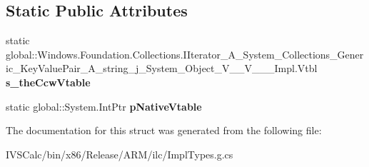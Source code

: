 \subsection*{Static Public Attributes}
\begin{DoxyCompactItemize}
\item 
\mbox{\label{struct_windows_1_1_foundation_1_1_collections_1_1_i_iterator___a___system___collections___generi1b6291336687b5a660c835303ec8be78_a1b742dc3e4c25b4e0a80811a9b7ffa29}} 
static global\+::\+Windows.\+Foundation.\+Collections.\+I\+Iterator\+\_\+\+A\+\_\+\+System\+\_\+\+Collections\+\_\+\+Generic\+\_\+\+Key\+Value\+Pair\+\_\+\+A\+\_\+string\+\_\+j\+\_\+\+System\+\_\+\+Object\+\_\+\+V\+\_\+\+\_\+\+V\+\_\+\+\_\+\+\_\+\+Impl.\+Vtbl {\bfseries s\+\_\+the\+Ccw\+Vtable}
\item 
\mbox{\label{struct_windows_1_1_foundation_1_1_collections_1_1_i_iterator___a___system___collections___generi1b6291336687b5a660c835303ec8be78_adba378fbbb58ce514b64a64c04f9c7b4}} 
static global\+::\+System.\+Int\+Ptr {\bfseries p\+Native\+Vtable}
\end{DoxyCompactItemize}


The documentation for this struct was generated from the following file\+:\begin{DoxyCompactItemize}
\item 
I\+V\+S\+Calc/bin/x86/\+Release/\+A\+R\+M/ilc/Impl\+Types.\+g.\+cs\end{DoxyCompactItemize}
